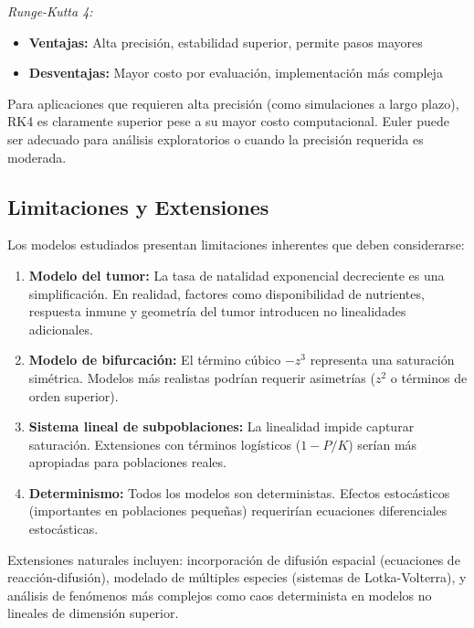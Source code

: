 \documentclass[a4paper,10pt,twocolumn]{article}
\begin{document}
\textit{Runge-Kutta 4:}
\begin{itemize}
    \item \textbf{Ventajas:} Alta precisión, estabilidad superior, permite pasos mayores
    \item \textbf{Desventajas:} Mayor costo por evaluación, implementación más compleja
\end{itemize}

Para aplicaciones que requieren alta precisión (como simulaciones a largo plazo), RK4 es claramente superior pese a su mayor costo computacional. Euler puede ser adecuado para análisis exploratorios o cuando la precisión requerida es moderada.

\subsection{Limitaciones y Extensiones}\label{subsec:limitaciones}

Los modelos estudiados presentan limitaciones inherentes que deben considerarse:

\begin{enumerate}
    \item \textbf{Modelo del tumor:} La tasa de natalidad exponencial decreciente es una simplificación. En realidad, factores como disponibilidad de nutrientes, respuesta inmune y geometría del tumor introducen no linealidades adicionales.

    \item \textbf{Modelo de bifurcación:} El término cúbico $-z^3$ representa una saturación simétrica. Modelos más realistas podrían requerir asimetrías ($z^2$ o términos de orden superior).

    \item \textbf{Sistema lineal de subpoblaciones:} La linealidad impide capturar saturación. Extensiones con términos logísticos ($1 - P/K$) serían más apropiadas para poblaciones reales.

    \item \textbf{Determinismo:} Todos los modelos son deterministas. Efectos estocásticos (importantes en poblaciones pequeñas) requerirían ecuaciones diferenciales estocásticas.
\end{enumerate}

Extensiones naturales incluyen: incorporación de difusión espacial (ecuaciones de reacción-difusión), modelado de múltiples especies (sistemas de Lotka-Volterra), y análisis de fenómenos más complejos como caos determinista en modelos no lineales de dimensión superior.
\end{document}
